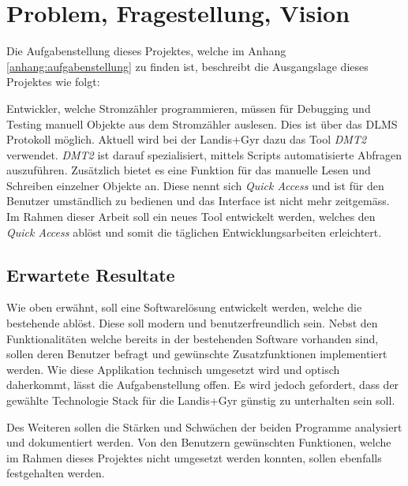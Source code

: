 \chapter{Problem, Fragestellung, Vision}


Die Aufgabenstellung dieses Projektes, welche im Anhang \ref{anhang:aufgabenstellung} zu finden ist, beschreibt die Ausgangslage dieses Projektes wie folgt:

\dq Entwickler, welche Stromzähler programmieren, müssen für Debugging und Testing manuell Objekte aus dem Stromzähler auslesen.
Dies ist über das DLMS Protokoll möglich.
Aktuell wird bei der Landis+Gyr dazu das Tool \textit{DMT2} verwendet.
\textit{DMT2} ist darauf spezialisiert, mittels Scripts automatisierte Abfragen auszuführen.
Zusätzlich bietet es eine Funktion für das manuelle Lesen und Schreiben einzelner Objekte an.
Diese nennt sich \textit{Quick Access} und ist für den Benutzer umständlich zu bedienen und das Interface ist nicht mehr zeitgemäss.
Im Rahmen dieser Arbeit soll ein neues Tool entwickelt werden, welches den \textit{Quick Access} ablöst und somit die täglichen Entwicklungsarbeiten erleichtert.\dq

\section{Erwartete Resultate}\label{erwarteteResultate}
Wie oben erwähnt, soll eine Softwarelösung entwickelt werden, welche die bestehende ablöst.
Diese soll modern und benutzerfreundlich sein.
Nebst den Funktionalitäten welche bereits in der bestehenden Software vorhanden sind, sollen deren Benutzer befragt und gewünschte Zusatzfunktionen implementiert werden.
Wie diese Applikation technisch umgesetzt wird und optisch daherkommt, lässt die Aufgabenstellung offen.
Es wird jedoch gefordert, dass der gewählte Technologie Stack für die Landis+Gyr günstig zu unterhalten sein soll.

Des Weiteren sollen die Stärken und Schwächen der beiden Programme analysiert und dokumentiert werden.
Von den Benutzern gewünschten Funktionen, welche im Rahmen dieses Projektes nicht umgesetzt werden konnten, sollen ebenfalls festgehalten werden.

